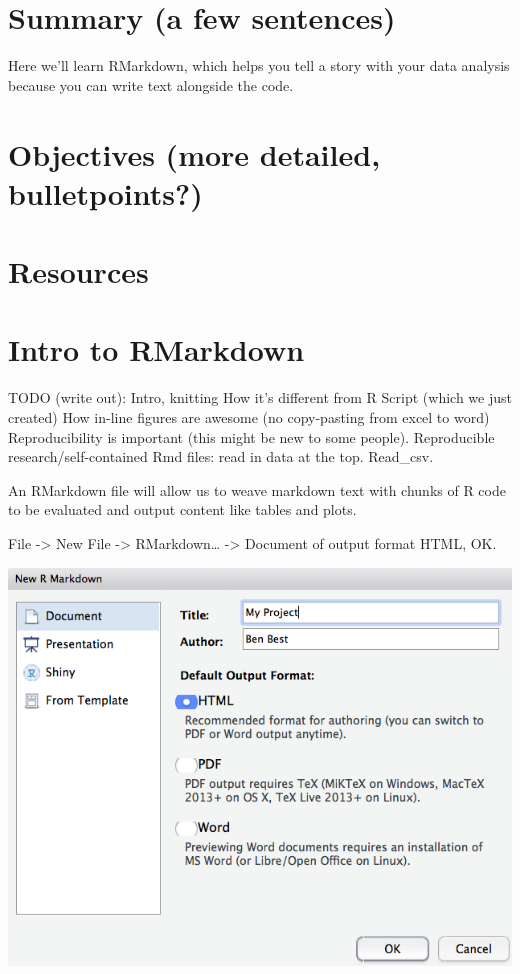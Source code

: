\documentclass[]{book}
\begin{document}
\hypertarget{summary-a-few-sentences-1}{%
\section{Summary (a few sentences)}\label{summary-a-few-sentences-1}}

Here we'll learn RMarkdown, which helps you tell a story with your data analysis because you can write text alongside the code.

\hypertarget{objectives-more-detailed-bulletpoints-1}{%
\section{Objectives (more detailed, bulletpoints?)}\label{objectives-more-detailed-bulletpoints-1}}

\hypertarget{resources-2}{%
\section{Resources}\label{resources-2}}

\hypertarget{intro-to-rmarkdown}{%
\section{Intro to RMarkdown}\label{intro-to-rmarkdown}}

TODO (write out):
Intro, knitting
How it's different from R Script (which we just created)
How in-line figures are awesome (no copy-pasting from excel to word)
Reproducibility is important (this might be new to some people). Reproducible research/self-contained Rmd files: read in data at the top. Read\_csv.

An RMarkdown file will allow us to weave markdown text with chunks of R code to be evaluated and output content like tables and plots.

File -\textgreater{} New File -\textgreater{} RMarkdown\ldots{} -\textgreater{} Document of output format HTML, OK.

\includegraphics[width=0.8\linewidth]{img/rstudio_new-rmd-doc-html}
\end{document}

